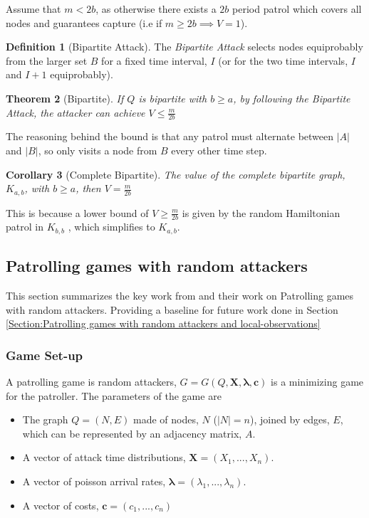 \documentclass[a4paper,10pt]{article}
\newtheorem{theorem}{Theorem}[section]
\newtheorem{corollary}[theorem]{Corollary}
\theoremstyle{definition}
\newtheorem{definition}[theorem]{Definition}
\theoremstyle{definition}
\theoremstyle{remark}
\theoremstyle{definition}
\begin{document}
Assume that $m < 2b$, as otherwise there exists a $2b$ period patrol which covers all nodes and guarantees capture (i.e if $m \geq 2b  \implies V=1$).

\begin{definition}[Bipartite Attack]
The \textit{Bipartite Attack} selects nodes equiprobably from the larger set $B$ for a fixed time interval, $I$ (or for the two time intervals, $I$ and $I+1$ equiprobably).
\end{definition}

\begin{theorem}[Bipartite]
If $Q$ is bipartite with $b \geq a$, by following the Bipartite Attack, the attacker can achieve $V \leq \frac{m}{2b}$
\end{theorem}

The reasoning behind the bound is that any patrol must alternate between $|A|$ and $|B|$, so only visits a node from $B$ every other time step. 

\begin{corollary}[Complete Bipartite]
\label{Corollary:Complete Bipartite}
The value of the complete bipartite graph, $K_{a,b}$, with $b \geq a$, then $V=\frac{m}{2b}$
\end{corollary}

This is because a lower bound of $V \geq \frac{m}{2b}$ is given by the random Hamiltonian patrol in $K_{b,b}$ , which simplifies to $K_{a,b}$.

\subsection{Patrolling games with random attackers}
\label{Section:Patrolling games with random attackers}
This section summarizes the key work from \cite{Lin2013} and their work on Patrolling games with random attackers. Providing a baseline for future work done in Section \ref{Section:Patrolling games with random attackers and local-observations}

\subsubsection{Game Set-up}
A patrolling game is random attackers, $G=G(Q,\bm{X},\bm{\lambda},\bm{c})$ is a minimizing game for the patroller. The parameters of the game are

\begin{itemize}
\item The graph $Q=(N,E)$ made of nodes, $N$ ($|N|=n$), joined by edges, $E$, which can be represented by an adjacency matrix, $A$.
\item A vector of attack time distributions, $\bm{X}=(X_{1},...,X_{n})$.
\item A vector of poisson arrival rates, $\bm{\lambda}=(\lambda_{1},...,\lambda_{n})$.
\item A vector of costs, $\bm{c}=(c_{1},...,c_{n})$
\end{itemize}
\end{document}
